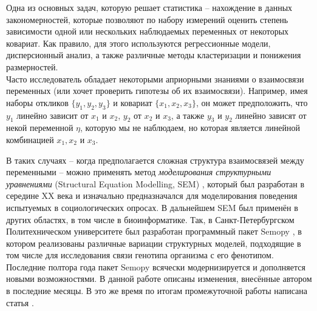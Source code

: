 Одна из основных задач, которую решает статистика -- нахождение в данных закономерностей, которые позволяют по набору измерений оценить степень зависимости одной или нескольких наблюдаемых переменных от некоторых ковариат.
Как правило, для этого используются регрессионные модели, дисперсионный анализ, а также различные методы кластеризации и понижения размерностей. \\

Часто исследователь обладает некоторыми априорными знаниями о взаимосвязи переменных (или хочет проверить гипотезы об их взаимосвязи).
Например, имея наборы откликов $ \{ y_1, y_2, y_3 \} $ и ковариат  $ \{ x_1, x_2, x_3 \} $, он может предположить, что $ y_1 $ линейно зависит от $ x_1  $ и $ x_2 $, $ y_2 $ от $ x_2 $ и $ x_3 $, а также $ y_3 $ и $ y_2 $ линейно зависят от некой переменной $ \eta $, которую мы не наблюдаем, но которая является линейной комбинацией $ x_1, x_2 $ и $ x_3 $.

В таких случаях -- когда предполагается сложная структура взаимосвязей между переменными -- можно применять метод \emph{моделирования структурными уравнениями} (Structural Equation Modelling, SEM) \cite{hoyle2021sem}, который был разработан в середине XX века и изначально предназначался для моделирования поведения испытуемых в социологических опросах.
В дальнейшем SEM был применён в других областях, в том числе в биоинформатике.
Так, в Санкт-Петербургском Политехническом университете был разработан программный пакет Semopy \cite{semopy, semopy2}, в котором реализованы различные вариации структурных моделей, подходящие в том числе для исследования связи генотипа организма с его фенотипом. \\

Последние полтора года пакет Semopy всячески модернизируется и дополняется новыми возможностями.
В данной работе описаны изменения, внесённые автором в последние месяцы.
В это же время по итогам промежуточной работы написана статья \cite{lanczos}.
